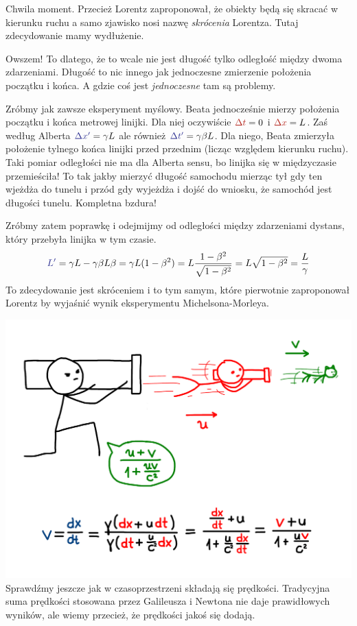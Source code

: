 \documentclass[10pt,twocolumn,fleqn,polish]{article}
\providecommand{\mathcolor}[2]{{\color{#1}#2}}
\newcommand{\mred}[1]{\mathcolor{BrickRed}{#1}}
\newcommand{\mblue}[1]{\mathcolor{Blue}{#1}}
\begin{document}
Chwila moment. Przecież Lorentz zaproponował, że obiekty będą się skracać w kierunku ruchu
a samo zjawisko nosi nazwę \textit{skrócenia} Lorentza.
Tutaj zdecydowanie mamy wydłużenie.

Owszem! To dlatego, że to wcale nie jest długość tylko odległość między dwoma zdarzeniami.
Długość to nic innego jak jednoczesne zmierzenie położenia początku i końca.
A gdzie coś jest \textit{jednoczesne} tam są problemy.

Zróbmy jak zawsze eksperyment myślowy. Beata jednocześnie mierzy położenia początku
i końca metrowej linijki. Dla niej oczywiście $\mred{\Delta t} = 0$ i $\mred{\Delta x} = L$.
Zaś według Alberta $\mblue{\Delta x'} = \gamma L$ ale również $\mblue{\Delta t'} = \gamma\beta L$.
Dla niego, Beata zmierzyła położenie tylnego końca linijki przed przednim (licząc względem kierunku ruchu).
Taki pomiar odległości nie ma dla Alberta sensu, bo linijka się w międzyczasie przemieściła!
To tak jakby mierzyć długość samochodu mierząc tył gdy ten wjeżdża do tunelu
i przód gdy wyjeżdża i dojść do wniosku, że samochód jest długości tunelu.
Kompletna bzdura!

Zróbmy zatem poprawkę i odejmijmy od odległości między zdarzeniami dystans,
który przebyła linijka w tym czasie.
\[
  \mblue{L'} = \gamma L - \gamma \beta L \beta = \gamma L (1 - \beta^2) = L \frac{1 - \beta^2}{\sqrt{1 - \beta^2}} = L \sqrt{1 - \beta^2} = \frac{L}{\gamma}
\]
To zdecydowanie jest skróceniem i to tym samym, które pierwotnie zaproponował Lorentz
by wyjaśnić wynik eksperymentu Michelsona-Morleya.
\newpage

\noindent\includegraphics[width=1\linewidth]{pages/STA-page28}
Sprawdźmy jeszcze jak w czasoprzestrzeni składają się prędkości.
Tradycyjna suma prędkości stosowana przez Galileusza i Newtona nie daje
prawidłowych wyników, ale wiemy przecież, że prędkości jakoś się dodają.
\end{document}
